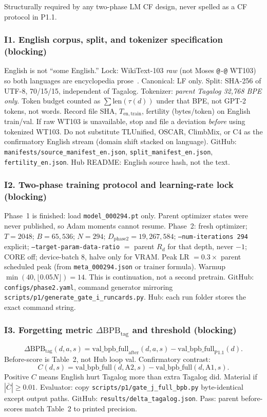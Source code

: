 \documentclass[11pt,a4paper]{article}
\begin{document}
Structurally required by any two-phase LM CF design, never spelled as a CF protocol in P1.1.

\subsubsection*{I1. English corpus, split, and tokenizer specification (blocking)}
English is not ``some English.'' Lock: WikiText-103 \emph{raw} (not Moses \texttt{@-@} WT103) so both languages are encyclopedia prose~\cite{merity2017pointer}. Canonical: LF only. Split: SHA-256 of UTF-8, 70/15/15, independent of Tagalog. Tokenizer: \emph{parent Tagalog 32{,}768 BPE only}. Token budget counted as $\sum\mathrm{len}(\tau(d))$ under that BPE, not GPT-2 tokens, not words. Record file SHA, $T_{\mathrm{en,train}}$, fertility (bytes/token) on English train/val. If raw WT103 is unavailable, stop and file a deviation \emph{before} using tokenized WT103. Do not substitute TLUnified, OSCAR, ClimbMix, or C4 as the confirmatory English stream (domain shift stacked on language). GitHub: \texttt{manifests/source\_manifest\_en.json}, \texttt{split\_manifest\_en.json}, \texttt{fertility\_en.json}. Hub README: English source hash, not the text.

\subsubsection*{I2. Two-phase training protocol and learning-rate lock (blocking)}
Phase~1 is finished: load \texttt{model\_000294.pt} only. Parent optimizer states were never published, so Adam moments cannot resume. Phase~2: fresh optimizer; $T=2048$; $B=65{,}536$; $N=294$; $D_{\mathrm{phase2}}=19{,}267{,}584$; \texttt{--num-iterations 294} explicit; \texttt{--target-param-data-ratio} $=$ parent $R_d$ for that depth, never $-1$; CORE off; device-batch 8, halve only for VRAM. Peak LR $=0.3\times$ parent scheduled peak (from \texttt{meta\_000294.json} or trainer formula). Warmup $\min(40,\lfloor 0.05N\rfloor)=14$. This is continuation, not a second pretrain. GitHub: \texttt{configs/phase2.yaml}, command generator mirroring \texttt{scripts/p1/generate\_gate\_i\_runcards.py}. Hub: each run folder stores the exact command string.

\subsubsection*{I3. Forgetting metric $\Delta\mathrm{BPB}_{\mathrm{tag}}$ and threshold (blocking)}
\[
\Delta\mathrm{BPB}_{\mathrm{tag}}(d,a,s)=\mathrm{val\_bpb\_full}_{\mathrm{after}}(d,a,s)-\mathrm{val\_bpb\_full}_{\mathrm{P1.1}}(d).
\]
Before-score is Table~2, not Hub loop val. Confirmatory contrast:
\[
C(d,s)=\mathrm{val\_bpb\_full}(d,\mathrm{A2},s)-\mathrm{val\_bpb\_full}(d,\mathrm{A1},s).
\]
Positive $C$ means English hurt Tagalog more than extra Tagalog did. Material if $|\bar C|\ge 0.01$. Evaluator: copy \texttt{scripts/p1/gate\_j\_full\_bpb.py} byte-identical except output paths. GitHub: \texttt{results/delta\_tagalog.json}. Pass: parent before-scores match Table~2 to printed precision.
\end{document}
